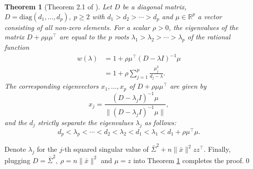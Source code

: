 \documentclass[11pt]{article}
\newtheorem{theorem}{Theorem}
\newcommand{\bbR}{\mathbb{R}}
\begin{document}
\begin{theorem}[Theorem 2.1 of \cite{Cuppen}]\label{interlacing}
	Let $D$ be a diagonal matrix, $D = \mathrm{diag} (d_1, \ldots, d_p), ~p\geq 2$ with $d_1 > d_2 > \cdots > d_p$ and $\mu\in\bbR^p$ a vector consisting of all non-zero elements. For a scalar $\rho > 0$, the eigenvalues of the matrix $D + \rho \mu\mu^\top$ are equal to the $p$ roots $\lambda_1 > \lambda_2 > \cdots  > \lambda_p$ of the rational function
	\begin{equation*}
		\begin{aligned}
			w(\lambda) &= 1 + \rho \mu^\top (D-\lambda I)^{-1} \mu \\
			&= 1 + \rho \sum_{j=1}^p \frac{\mu_j^2}{d_j - \lambda}.
		\end{aligned}
	\end{equation*}
	The corresponding eigenvectors $x_1, \ldots, x_p$ of $D+\rho \mu\mu^\top$ are given by 
	\begin{equation*}
		x_j = \frac{(D-\lambda_j I)^{-1}\mu}{\|(D-\lambda_j I)^{-1}\mu\|},
	\end{equation*}
	and the $d_j$ strictly separate the eigenvalues $\lambda_j$ as follows:
	\begin{equation*}
		d_p < \lambda_p < \cdots  < d_2 < \lambda_2 < d_1 < \lambda_1 < d_1 + \rho \mu^\top \mu.
	\end{equation*}
\end{theorem}

Denote $\lambda_j$ for the $j$-th squared singular value of $\bar{\Sigma}^2 + n \|\bar{x}\|^2 zz^\top$. Finally, plugging $D = \bar{\Sigma}^2,~\rho = n\|\bar{x}\|^2$ and $\mu = z$ into Theorem \ref{interlacing} completes the proof.\qed
\end{document}
